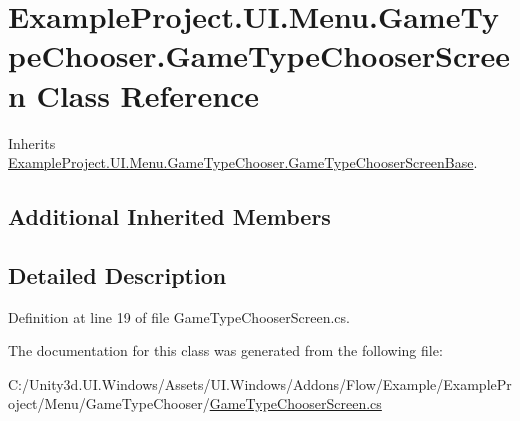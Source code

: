 \hypertarget{class_example_project_1_1_u_i_1_1_menu_1_1_game_type_chooser_1_1_game_type_chooser_screen}{}\section{Example\+Project.\+U\+I.\+Menu.\+Game\+Type\+Chooser.\+Game\+Type\+Chooser\+Screen Class Reference}
\label{class_example_project_1_1_u_i_1_1_menu_1_1_game_type_chooser_1_1_game_type_chooser_screen}


Inherits \hyperlink{class_example_project_1_1_u_i_1_1_menu_1_1_game_type_chooser_1_1_game_type_chooser_screen_base}{Example\+Project.\+U\+I.\+Menu.\+Game\+Type\+Chooser.\+Game\+Type\+Chooser\+Screen\+Base}.

\subsection*{Additional Inherited Members}


\subsection{Detailed Description}


Definition at line 19 of file Game\+Type\+Chooser\+Screen.\+cs.



The documentation for this class was generated from the following file\+:\begin{DoxyCompactItemize}
\item 
C\+:/\+Unity3d.\+U\+I.\+Windows/\+Assets/\+U\+I.\+Windows/\+Addons/\+Flow/\+Example/\+Example\+Project/\+Menu/\+Game\+Type\+Chooser/\hyperlink{_game_type_chooser_screen_8cs}{Game\+Type\+Chooser\+Screen.\+cs}\end{DoxyCompactItemize}

